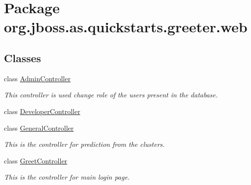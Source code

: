 \hypertarget{namespaceorg_1_1jboss_1_1as_1_1quickstarts_1_1greeter_1_1web}{}\section{Package org.\+jboss.\+as.\+quickstarts.\+greeter.\+web}
\label{namespaceorg_1_1jboss_1_1as_1_1quickstarts_1_1greeter_1_1web}
\subsection*{Classes}
\begin{DoxyCompactItemize}
\item 
class \hyperlink{classorg_1_1jboss_1_1as_1_1quickstarts_1_1greeter_1_1web_1_1_admin_controller}{Admin\+Controller}
\begin{DoxyCompactList}\small\item\em This controller is used change role of the users present in the database. \end{DoxyCompactList}\item 
class \hyperlink{classorg_1_1jboss_1_1as_1_1quickstarts_1_1greeter_1_1web_1_1_developer_controller}{Developer\+Controller}
\item 
class \hyperlink{classorg_1_1jboss_1_1as_1_1quickstarts_1_1greeter_1_1web_1_1_general_controller}{General\+Controller}
\begin{DoxyCompactList}\small\item\em This is the controller for prediction from the clusters. \end{DoxyCompactList}\item 
class \hyperlink{classorg_1_1jboss_1_1as_1_1quickstarts_1_1greeter_1_1web_1_1_greet_controller}{Greet\+Controller}
\begin{DoxyCompactList}\small\item\em This is the controller for main login page. \end{DoxyCompactList}\end{DoxyCompactItemize}
